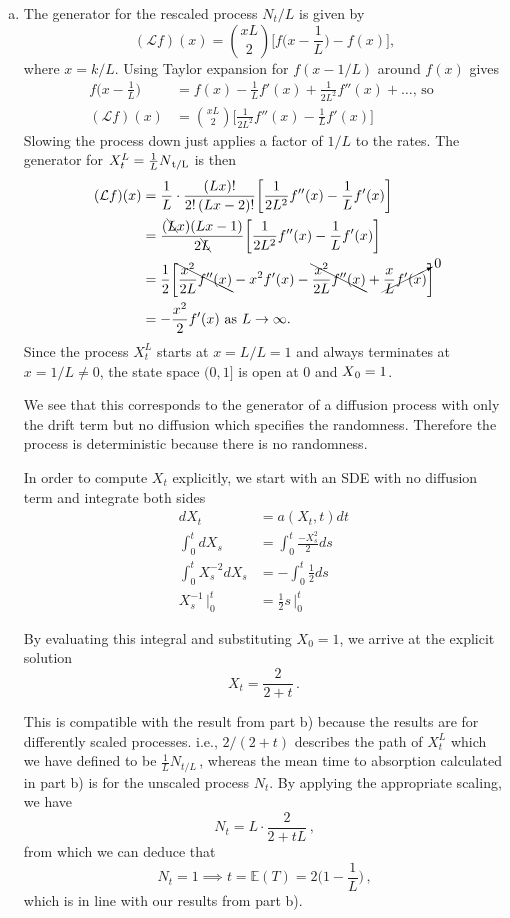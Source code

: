 \documentclass[12pt, twoside, a4paper]{article}
\newcommand{\Gen}{\mathcal{L}}
\begin{document}
\begin{enumerate}[a)]
\item
The generator for the rescaled process $N_t / L$ is given by 
\[
(\Gen f)(x) = {xL \choose 2} \bigg[ f \bigg(x - \frac{1}{L} \bigg) - f(x) \bigg] \text{,}
\]
where $x = k/L$. Using Taylor expansion for $f(x-1/L)$ around $f(x)$ gives
\begin{align*}
f \bigg(x - \frac{1}{L} \bigg) &= f(x) - \frac{1}{L}f'(x) + \frac{1}{2L^2}f''(x) + \dots \text{, so }\\
(\Gen f)(x) &= {xL \choose 2} \bigg[ \frac{1}{2L^2}f''(x) - \frac{1}{L}f'(x) \bigg]
\end{align*}
Slowing the process down just applies a factor of $1/L$ to the rates. The generator for $X_t^L= \frac{1}{L} N \textsubscript{t/L}$ is then 
\begin{align*}
(\Gen f)(x) 
&= \frac{1}{L} \cdot \frac{(Lx)!}{2! \, (Lx-2)!} \bigg[ \frac{1}{2L^2}f''(x) - \frac{1}{L}f'(x) \bigg]\\
&= \frac{(\bcancel{L}x)(Lx-1)}{2\bcancel{L}} \bigg[ \frac{1}{2L^2}f''(x) - \frac{1}{L}f'(x) \bigg]\\
&= \frac{1}{2} \bigg[ \bcancel{\frac{x^2}{2L}f''(x)} - x^2 f'(x) - \bcancel{\frac{x^2}{2L}f''(x)} + \cancelto{0}{\frac{x}{L}f'(x)} \bigg]\\
&= - \frac{x^2}{2} f'(x) \text{ as } L \to \infty \text{.}
\end{align*}
Since the process $X_t^L$ starts at $x = L/L = 1$ and always terminates at $x = 1/L \neq 0$, the state space $(0, 1]$ is open at $0$ and  $X \textsubscript{0} = 1$.

We see that this corresponds to the generator of a diffusion process with only the drift term but no diffusion which specifies the randomness. Therefore the process is deterministic because there is no randomness. 

In order to compute $X_t$ explicitly, we start with an SDE with no diffusion term and integrate both sides
\begin{align*}
dX_t &= a(X_t, t) dt \\
\int_0^t dX_s &= \int_0^t \frac{-X_s^2}{2} ds \\
\int_0^t X_s^{-2} dX_s &= - \int_0^t \frac{1}{2} ds \\ 
X_s^{-1} \, \Big| _0^t &= \frac{1}{2} s \, \Big| _0^t
\end{align*}

By evaluating this integral and substituting $X_0 = 1$, we arrive at the explicit solution
\[
X_t = \frac{2}{2+t} \, \text{.}
\]

This is compatible with the result from part b) because the results are for differently scaled processes. i.e., $2/(2+t)$ describes the path of $X_t^L$ which we have defined to be $\frac{1}{L} N_{t/L} \, $, whereas the mean time to absorption calculated in part b) is for the unscaled process $N_t$. By applying the appropriate scaling, we have 
\[
N_t = L \cdot \frac{2}{2+tL} \, \text{,}
\]
from which we can deduce that 
\[N_t = 1 \implies t = \mathbb{E} (T) = 2 \bigg(1 - \frac{1}{L} \bigg) \, \text{,}
\]
which is in line with our results from part b).


\end{enumerate}
\end{document}
